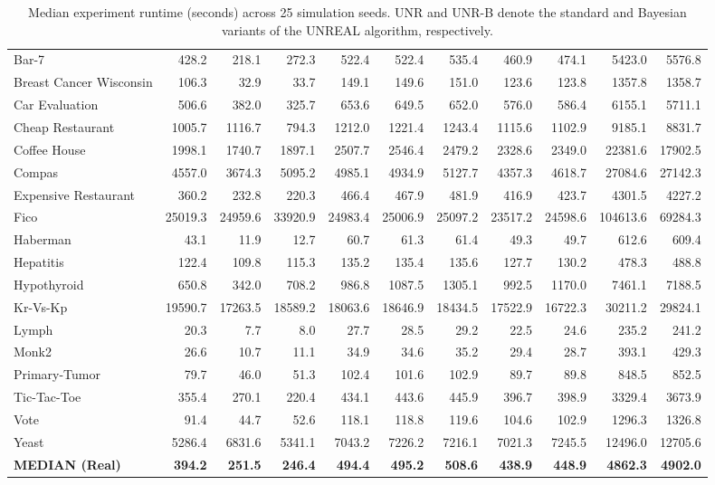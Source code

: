 \begin{table}[htbp]
\begin{tabular}{l rrrrrrrrrr}
        Bar-7 & 428.2 & 218.1 & 272.3 & 522.4 & 522.4 & 535.4 & 460.9 & 474.1 & 5423.0 & 5576.8 \\
        Breast Cancer Wisconsin & 106.3 & 32.9 & 33.7 & 149.1 & 149.6 & 151.0 & 123.6 & 123.8 & 1357.8 & 1358.7 \\
        Car Evaluation & 506.6 & 382.0 & 325.7 & 653.6 & 649.5 & 652.0 & 576.0 & 586.4 & 6155.1 & 5711.1 \\
        Cheap Restaurant & 1005.7 & 1116.7 & 794.3 & 1212.0 & 1221.4 & 1243.4 & 1115.6 & 1102.9 & 9185.1 & 8831.7 \\
        Coffee House & 1998.1 & 1740.7 & 1897.1 & 2507.7 & 2546.4 & 2479.2 & 2328.6 & 2349.0 & 22381.6 & 17902.5 \\
        Compas & 4557.0 & 3674.3 & 5095.2 & 4985.1 & 4934.9 & 5127.7 & 4357.3 & 4618.7 & 27084.6 & 27142.3 \\
        Expensive Restaurant & 360.2 & 232.8 & 220.3 & 466.4 & 467.9 & 481.9 & 416.9 & 423.7 & 4301.5 & 4227.2 \\
        Fico & 25019.3 & 24959.6 & 33920.9 & 24983.4 & 25006.9 & 25097.2 & 23517.2 & 24598.6 & 104613.6 & 69284.3 \\
        Haberman & 43.1 & 11.9 & 12.7 & 60.7 & 61.3 & 61.4 & 49.3 & 49.7 & 612.6 & 609.4 \\
        Hepatitis & 122.4 & 109.8 & 115.3 & 135.2 & 135.4 & 135.6 & 127.7 & 130.2 & 478.3 & 488.8 \\
        Hypothyroid & 650.8 & 342.0 & 708.2 & 986.8 & 1087.5 & 1305.1 & 992.5 & 1170.0 & 7461.1 & 7188.5 \\
        Kr-Vs-Kp & 19590.7 & 17263.5 & 18589.2 & 18063.6 & 18646.9 & 18434.5 & 17522.9 & 16722.3 & 30211.2 & 29824.1 \\
        Lymph & 20.3 & 7.7 & 8.0 & 27.7 & 28.5 & 29.2 & 22.5 & 24.6 & 235.2 & 241.2 \\
        Monk2 & 26.6 & 10.7 & 11.1 & 34.9 & 34.6 & 35.2 & 29.4 & 28.7 & 393.1 & 429.3 \\
        Primary-Tumor & 79.7 & 46.0 & 51.3 & 102.4 & 101.6 & 102.9 & 89.7 & 89.8 & 848.5 & 852.5 \\
        Tic-Tac-Toe & 355.4 & 270.1 & 220.4 & 434.1 & 443.6 & 445.9 & 396.7 & 398.9 & 3329.4 & 3673.9 \\
        Vote & 91.4 & 44.7 & 52.6 & 118.1 & 118.8 & 119.6 & 104.6 & 102.9 & 1296.3 & 1326.8 \\
        Yeast & 5286.4 & 6831.6 & 5341.1 & 7043.2 & 7226.2 & 7216.1 & 7021.3 & 7245.5 & 12496.0 & 12705.6 \\
        \midrule
        \textbf{MEDIAN (Real)} & \textbf{394.2} & \textbf{251.5} & \textbf{246.4} & \textbf{494.4} & \textbf{495.2} & \textbf{508.6} & \textbf{438.9} & \textbf{448.9} & \textbf{4862.3} & \textbf{4902.0} \\
        \bottomrule
    \end{tabular}
    \caption{Median experiment runtime (seconds) across 25 simulation seeds. UNR and UNR-B denote the standard and Bayesian variants of the UNREAL algorithm, respectively.}
    \label{tab:RuntimeComparison}
\end{table}
